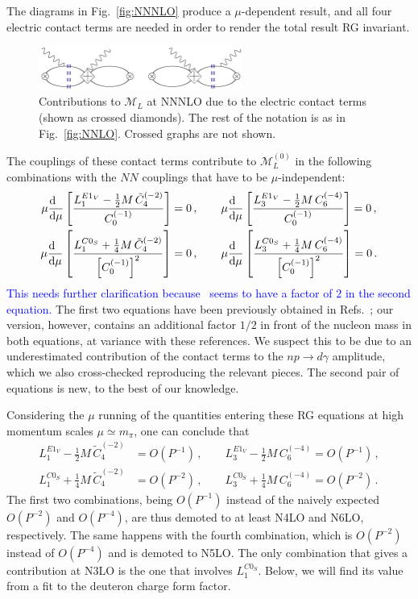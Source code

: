 \documentclass[prl,
twocolumn,
showpacs,preprintnumbers,amsmath,amssymb,
superscriptaddress,
a4paper,nofootinbib,longbibliography]{revtex4-2}
\begin{document}
The diagrams in Fig.~\ref{fig:NNNLO} produce a $\mu$-dependent result, and all four electric contact terms are needed in order to render the total result RG invariant.
\begin{figure}[htb]
    \centering
    \includegraphics[width=0.6\textwidth]{figs/VVCS_NNNLO_CT_v1.pdf}
    \caption{Contributions to $\mathcal{M}_L$ at NNNLO due to the electric contact terms (shown as crossed diamonds). The rest of the notation is as in Fig.~\ref{fig:NNLO}. Crossed graphs are not shown.}
    \label{fig:NNNLO_CT}
\end{figure}
The couplings of these contact terms contribute to $\mathcal{M}_L^{(0)}$ in the following combinations with the $NN$ couplings that have to be $\mu$-independent:
\begin{align}
\mu\frac{\mathrm{d}\hphantom{\mu}}{\mathrm{d}\mu} \left[
\frac{L_1^{E1_V}-\frac{1}{2}M\, \tilde{C}_4^{(-2)}}{C_0^{(-1)}}
\right] & = 0\,,\qquad 
\mu\frac{\mathrm{d}\hphantom{\mu}}{\mathrm{d}\mu} \left[
\frac{L_3^{E1_V}-\frac{1}{2}M\, C_6^{(-4)}}{C_0^{(-1)}}
\right] = 0\,,\\
\mu\frac{\mathrm{d}\hphantom{\mu}}{\mathrm{d}\mu} \left[
\frac{L_1^{C0_S}+\frac{1}{4}M\,\tilde{C}_4^{(-2)}}{\left[C_0^{(-1)}\right]^2}
\right] & = 0\,,\qquad
\mu\frac{\mathrm{d}\hphantom{\mu}}{\mathrm{d}\mu} \left[
\frac{L_3^{C0_S}+\frac{1}{4}M\, C_6^{(-4)}}{\left[C_0^{(-1)}\right]^2}
\right] = 0\,.
\end{align}
\textcolor{blue}{This needs further clarification because~\cite{Rupak:1999rk} seems to have a factor of $2$ in the second equation.}
The first two equations have been previously obtained in Refs.~\cite{Chen:1999bg,Rupak:1999rk};
our version, however, contains an additional factor $1/2$ in front of the nucleon mass in both equations, at variance with these references. We suspect this to be due to an underestimated contribution of the contact terms to the $np\to d\gamma$ amplitude, which we also cross-checked reproducing the relevant pieces. The second pair of equations is new, to the best of our knowledge.

Considering the $\mu$ running of the quantities entering these RG equations at high momentum scales $\mu\simeq m_\pi$, one can conclude that
\begin{align}
L_1^{E1_V}-\frac{1}{2}M\, \tilde{C}_4^{(-2)}&=O(P^{-1}) \,,\qquad 
L_3^{E1_V}-\frac{1}{2}M\, C_6^{(-4)} = O(P^{-1})\,,\\
L_1^{C0_S}+\frac{1}{4}M\,\tilde{C}_4^{(-2)}&=O(P^{-2}) \,,\qquad
L_3^{C0_S}+\frac{1}{4}M\, C_6^{(-4)} = O(P^{-2})\,.
\end{align}
The first two combinations, being $O(P^{-1})$ instead of the naively expected $O(P^{-2})$ and $O(P^{-4})$, are thus demoted to at least N4LO and N6LO, respectively. The same happens with the fourth combination, which is $O(P^{-2})$ instead of $O(P^{-4})$ and is demoted to N5LO. The only combination that gives a contribution at N3LO is the one that involves $L_1^{C0_S}$. Below, we will find its value from a fit to the deuteron charge form factor.
\end{document}
